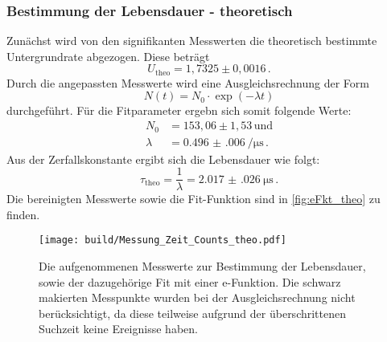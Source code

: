   \subsubsection{Bestimmung der Lebensdauer - theoretisch}
    Zunächst wird von den signifikanten Messwerten die theoretisch bestimmte Untergrundrate abgezogen.
    Diese beträgt
    \begin{equation*}
      U_\text{theo} = 1,7325 \pm 0,0016 \, .
    \end{equation*}
    Durch die angepassten Messwerte wird eine Ausgleichsrechnung der Form
    \begin{equation*}
      N(t) = N_0 \cdot \exp(-\lambda t)
    \end{equation*}
    durchgeführt.
    Für die Fitparameter ergebn sich somit folgende Werte:
    \begin{align*}
      N_0 &= 153,06 \pm 1,53 \, \text{und}\\
      \lambda &= \SI{0.496(006)}{\per\micro\second} \, .
    \end{align*}
    Aus der Zerfallskonstante ergibt sich die Lebensdauer wie folgt:
    \begin{equation*}
      \tau_\text{theo} = \frac{1}{\lambda} = \SI{2.017(026)}{\micro\second} \, .
    \end{equation*}
    Die bereinigten Messwerte sowie die Fit-Funktion sind in \autoref{fig:eFkt_theo} zu finden.
    \begin{figure}
      \centering
      \texttt{[image: build/Messung\_Zeit\_Counts\_theo.pdf]}
      \caption{Die aufgenommenen Messwerte zur Bestimmung der Lebensdauer, sowie der dazugehörige Fit mit einer e-Funktion.
                Die schwarz makierten Messpunkte wurden bei der Ausgleichsrechnung nicht berücksichtigt, da diese teilweise aufgrund der überschrittenen Suchzeit keine Ereignisse haben.}
      \label{fig:eFkt_theo}
    \end{figure}